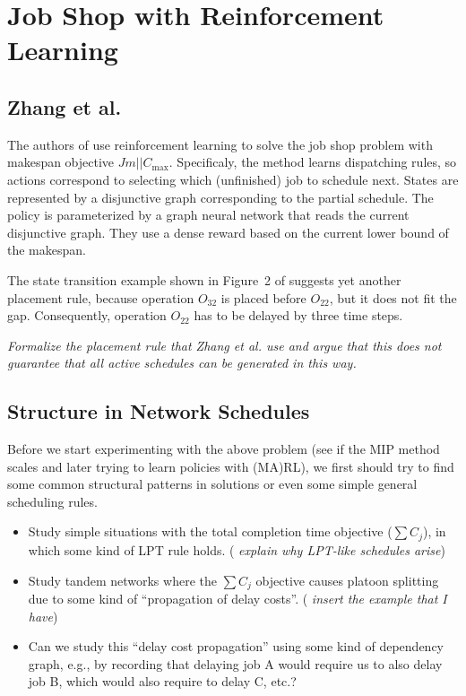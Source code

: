 \documentclass{article}
\theoremstyle{definition}
\theoremstyle{plain}
\begin{document}
\newpage

\section{Job Shop with Reinforcement Learning}

\subsection{Zhang et al.}

The authors of \cite{zhangLearningDispatchJob2020} use reinforcement learning to
solve the job shop problem with makespan objective $Jm || C_\text{max}$.
Specificaly, the method learns dispatching rules, so actions correspond to
selecting which (unfinished) job to schedule next. States are represented by a
disjunctive graph corresponding to the partial schedule. The policy is
parameterized by a graph neural network that reads the current disjunctive
graph. They use a dense reward based on the current lower bound of the makespan.



The state transition example shown in Figure~2 of
\cite{zhangLearningDispatchJob2020} suggests yet another placement rule, because
operation $O_{32}$ is placed before $O_{22}$, but it does not fit the gap.
Consequently, operation $O_{22}$ has to be delayed by three time steps.

\textit{\color{blue}Formalize the placement rule that Zhang et al. use and argue
that this does not guarantee that all active schedules can be generated in this
way.}



\subsection{Structure in Network Schedules}

Before we start experimenting with the above problem (see if the MIP method
scales and later trying to learn policies with (MA)RL), we first should try to
find some common structural patterns in solutions or even some simple general
scheduling rules.

\begin{itemize}
  \item Study simple situations with the total completion time objective ($\sum C_{j}$), in which some kind of LPT rule holds. (\textit{\color{blue} explain why LPT-like schedules arise})
  \item Study tandem networks where the $\sum C_{j}$ objective causes platoon splitting due to some kind of ``propagation of delay costs''. (\textit{\color{blue} insert the example that I have})
  \item Can we study this ``delay cost propagation'' using some kind of dependency graph, e.g., by recording that delaying job A would require us to also delay job B, which would also require to delay C, etc.?
\end{itemize}
\end{document}
